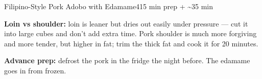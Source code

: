 \begin{recipebox}{Filipino-Style Pork Adobo with Edamame}{4}{15 min prep + \textasciitilde35 min}
\begin{notelist}
  \item \textbf{Loin vs shoulder:} loin is leaner but dries out easily under pressure --- cut it into large cubes and don't add extra time. Pork shoulder is much more forgiving and more tender, but higher in fat; trim the thick fat and cook it for 20 minutes.
  \item \textbf{Advance prep:} defrost the pork in the fridge the night before. The edamame goes in from frozen.
\end{notelist}

\end{recipebox}
